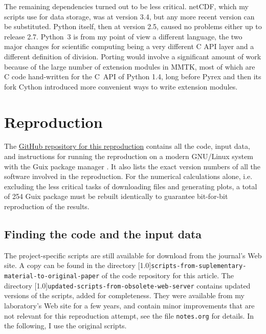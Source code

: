 The remaining dependencies turned out to be less critical. netCDF, which my scripts use for data storage, was at version 3.4, but any more recent version can be substituted. Python itself, then at version 2.5, caused no problems either up to release 2.7. Python~3 is from my point of view a different language, the two major changes for scientific computing being a very different C API layer and a different definition of division. Porting would involve a significant amount of work because of the large number of extension modules in MMTK, most of which are C code hand-written for the C~API of Python 1.4, long before Pyrex \cite{EwingPyrex2010} and then its fork Cython \cite{BehnelCythonBestBoth2011} introduced more convenient ways to write extension modules.

\section*{Reproduction}

The \href{https://github.com/khinsen/rescience-ten-year-challenge-paper-3}{GitHub repository for this reproduction} contains all the code, input data, and instructions for running the reproduction on a modern GNU/Linux system with the Guix package manager \cite{CourtesReproducibleUserControlledSoftware2015,WurmusPiGxreproduciblegenomics2018}. It also lists the exact version numbers of all the software involved in the reproduction. For the numerical calculations alone, i.e. excluding the less critical tasks of downloading files and generating plots, a total of 254 Guix package must be rebuilt identically to guarantee bit-for-bit reproduction of the results.

\subsection*{Finding the code and the input data}

The project-specific scripts are still available for download from the journal's Web site. A copy can be found in the directory \scalebox{.7}[1.0]{\texttt{scripts-from-suplementary-material-to-original-paper}} of the code repository for this article. The directory \scalebox{.7}[1.0]{\texttt{updated-scripts-from-obsolete-web-server}} contains updated versions of the scripts, added for completeness. They were available from my laboratory's Web site for a few years, and contain minor improvements that are not relevant for this reproduction attempt, see the file \texttt{notes.org} for details. In the following, I use the original scripts.

